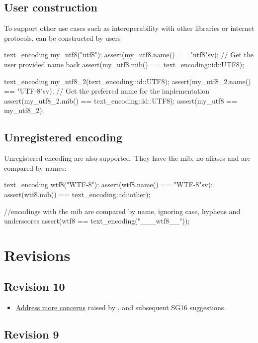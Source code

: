 \documentclass{wg21}
\begin{document}
\subsection{User construction}

To support other use cases such as interoperability with other libraries or internet protocols,
 can be constructed by users

\begin{colorblock}
text_encoding my_utf8("utf8");
assert(my_utf8.name() == "utf8"sv); // Get the user provided name back
assert(my_utf8.mib() == text_encoding::id::UTF8);

text_encoding my_utf8_2(text_encoding::id::UTF8);
assert(my_utf8_2.name() == "UTF-8"sv); // Get the preferred name for the implementation
assert(my_utf8_2.mib() == text_encoding::id::UTF8);
assert(my_utf8 == my_utf8_2);
\end{colorblock}

\subsection{Unregistered encoding}

Unregistered encoding are also supported. They have the  mib, no aliases and are compared
by names:

\begin{colorblock}
text_encoding wtf8("WTF-8");
assert(wtf8.name() == "WTF-8"sv);
assert(wtf8.mib() == text_encoding::id::other);

//encodings with the  mib are compared by name, ignoring case, hyphens and underscores
assert(wtf8 == text_encoding("___wtf8__"));
\end{colorblock}


\section{Revisions}

\subsection*{Revision 10}
\begin{itemize}
\item \hyperref[P2498-concerns]{Address more concerns} raised by , and subsequent SG16 suggestions.
\end{itemize}
    
\subsection*{Revision 9}
\end{document}
